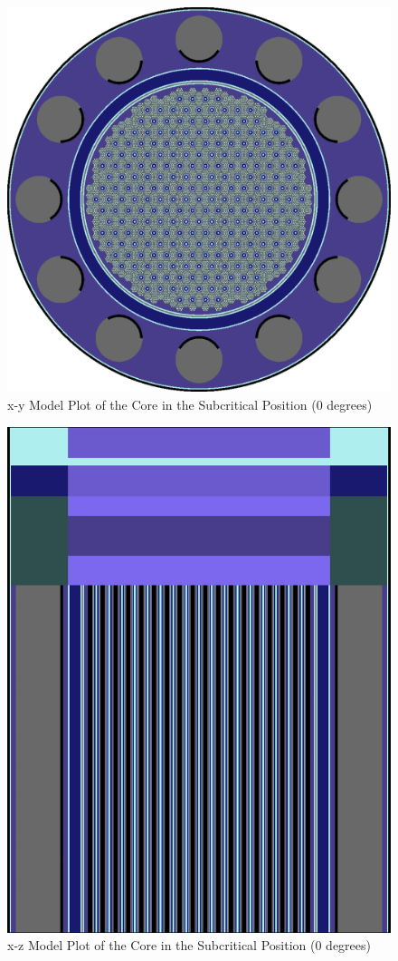 \documentclass[8pt,a5paper]{article}
\begin{document}
\begin{figure}[h!]
    \centering
    \includegraphics[width=1\linewidth]{figures/xy0_Reactor.png}
    \caption{x-y Model Plot of the Core in the Subcritical Position (0 degrees)}
    \label{fig:Figure 1}
\end{figure}

\begin{figure}[h!]
    \centering
    \includegraphics[width=1\linewidth]{figures/xz0_Reactor.png}
    \caption{x-z Model Plot of the Core in the Subcritical Position (0 degrees)}
    \label{fig:Figure 2}
\end{figure}
\end{document}

